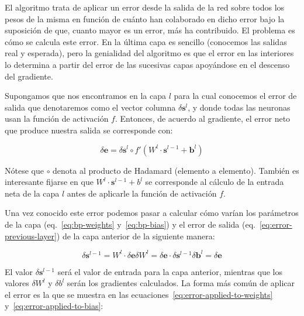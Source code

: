 El algoritmo trata de aplicar un error desde la salida de la red sobre todos los pesos de la misma en función de cuánto han colaborado en dicho error bajo la suposición de que, cuanto mayor es un error, más ha contribuido. El problema es cómo se calcula este error. En la última capa es sencillo (conocemos las salidas real y esperada), pero la genialidad del algoritmo es que el error en las interiores lo determina a partir del error de las sucesivas capas apoyándose en el descenso del gradiente.

Supongamos que nos encontramos en la capa $l$ para la cual conocemos el error de salida que denotaremos como el vector columna $\delta \mathbf{s}^l$, y donde todas las neuronas usan la función de activación $f$. Entonces, de acuerdo al gradiente, el error neto que produce nuestra salida se corresponde con:

\begin{equation}
	\delta \mathbf{e} = \delta \mathbf{s}^l \circ f'(W^l \cdot \mathbf{s}^{l-1} + \mathbf{b}^l)
\end{equation}

Nótese que $\circ$ denota al producto de Hadamard (elemento a elemento). También es interesante fijarse en que $W^l \cdot \mathbf{s}^{l-1} + b^l$ se corresponde al cálculo de la entrada neta de la capa $l$ antes de aplicarle la función de activación $f$.

Una vez conocido este error podemos pasar a calcular cómo varían los parámetros de la capa (eq.~\ref{eq:bp-weights} y~\ref{eq:bp-bias}) y el error de salida (eq.~\ref{eq:error-previous-layer}) de la capa anterior de la siguiente manera:

\begin{subequations}
	\begin{equation}
		\delta \mathbf{s}^{l-1} = W^{l} \cdot \delta \mathbf{e} \label{eq:error-previous-layer}
	\end{equation}
	\begin{equation}
		\delta W^l = \delta \mathbf{e} \cdot \delta \mathbf{s}^{l-1} \label{eq:bp-weights}
	\end{equation}
	\begin{equation}
		\delta \mathbf{b}^l = \delta \mathbf{e} \label{eq:bp-bias}
	\end{equation}
\end{subequations}

El valor $\delta \mathbf{s}^{l-1}$ será el valor de entrada para la capa anterior, mientras que los valores $\delta W^l$ y $\delta b^l$ serán los gradientes calculados. La forma más común de aplicar el error es la que se muestra en las ecuaciones~\ref{eq:error-applied-to-weights} y~\ref{eq:error-applied-to-bias}:

